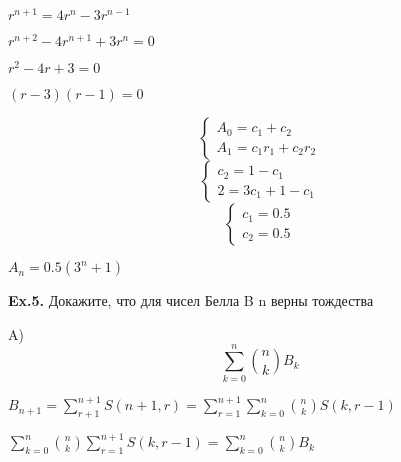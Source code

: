 \documentclass[a4paper,11pt]{article}
\begin{document}
\begin{center}
	$ r^{n+1} = 4r^{n} - 3r^{n-1}$
	
	$ r^{n+2} -4r^{n+1} +3r^n = 0 $
	
	$ r^2 - 4r +3=0 $
	
	$ (r-3)(r-1)=0 $
	
	\begin{equation*}
	 \begin{cases}
  	A_0 = c_1 +c_2	\\
	A_1 = c_1r_1 +c_2r_2
	 \end{cases}
\end{equation*}
	\begin{equation*}
	 \begin{cases}
	 c_2 = 1 - c_1\\
	 2 = 3c_1 + 1 - c_1
	 \end{cases}
\end{equation*}
	 \begin{equation*}
	 \begin{cases}
	 c_1 = 0.5\\
	 c_2 = 0.5
	  \end{cases}
\end{equation*}
	 
	 $ A_n = 0.5(3^n + 1) $
	  
\end{center}


\textbf{Ex.5.} Докажите, что для чисел Белла B n верны тождества

\*
A) \[ \sum\limits_{k=0}^{n}{n \choose k}B_k \]

$ B_{n+1} =  \sum\limits_{r+1}^{n+1} S(n+1, r) = \sum\limits_{r=1}^{n+1} \sum\limits_{k=0}^n{n \choose k} S(k, r-1) $

$ \sum\limits_{k = 0}^n{n \choose k} \sum\limits_{r=1}^{n+1} S(k, r-1) = \sum\limits_{k=0}^n {n \choose k}B_k $
\end{document}
